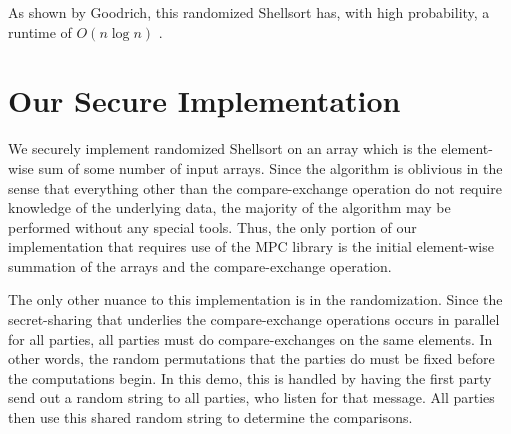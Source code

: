 \documentclass[11pt, oneside]{article}   	%
\begin{document}
As shown by Goodrich, this randomized Shellsort has, with high probability, a runtime of $O(n \log n)$ \cite{goodrich2010randomized}.

\section{Our Secure Implementation}

We securely implement randomized Shellsort on an array which is the element-wise sum of some number of input arrays. Since the algorithm is oblivious in the sense that everything other than the compare-exchange operation do not require knowledge of the underlying data, the majority of the algorithm may be performed without any special tools. Thus, the only portion of our implementation that requires use of the MPC library is the initial element-wise summation of the arrays and the compare-exchange operation. 

The only other nuance to this implementation is in the randomization. Since the secret-sharing that underlies the compare-exchange operations occurs in parallel for all parties, all parties must do compare-exchanges on the same elements. In other words, the random permutations that the parties do must be fixed before the computations begin. In this demo, this is handled by having the first party send out a random string to all parties, who listen for that message. All parties then use this shared random string to determine the comparisons.



\end{document}
